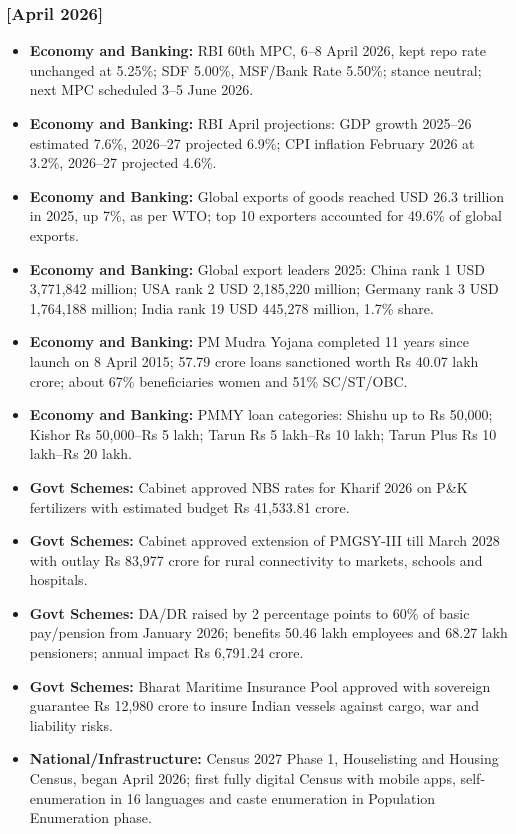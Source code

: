 \documentclass[10pt,a4paper]{article}
\newcommand{\monthtag}[1]{\textbf{[#1]}}
\begin{document}
\subsubsection{\monthtag{April 2026}}
\begin{itemize}
    \item \textbf{Economy and Banking:} RBI 60th MPC, 6--8 April 2026, kept repo rate unchanged at 5.25\%; SDF 5.00\%, MSF/Bank Rate 5.50\%; stance neutral; next MPC scheduled 3--5 June 2026.
    \item \textbf{Economy and Banking:} RBI April projections: GDP growth 2025--26 estimated 7.6\%, 2026--27 projected 6.9\%; CPI inflation February 2026 at 3.2\%, 2026--27 projected 4.6\%.
    \item \textbf{Economy and Banking:} Global exports of goods reached USD 26.3 trillion in 2025, up 7\%, as per WTO; top 10 exporters accounted for 49.6\% of global exports.
    \item \textbf{Economy and Banking:} Global export leaders 2025: China rank 1 USD 3,771,842 million; USA rank 2 USD 2,185,220 million; Germany rank 3 USD 1,764,188 million; India rank 19 USD 445,278 million, 1.7\% share.
    \item \textbf{Economy and Banking:} PM Mudra Yojana completed 11 years since launch on 8 April 2015; 57.79 crore loans sanctioned worth Rs 40.07 lakh crore; about 67\% beneficiaries women and 51\% SC/ST/OBC.
    \item \textbf{Economy and Banking:} PMMY loan categories: Shishu up to Rs 50,000; Kishor Rs 50,000--Rs 5 lakh; Tarun Rs 5 lakh--Rs 10 lakh; Tarun Plus Rs 10 lakh--Rs 20 lakh.
    \item \textbf{Govt Schemes:} Cabinet approved NBS rates for Kharif 2026 on P\&K fertilizers with estimated budget Rs 41,533.81 crore.
    \item \textbf{Govt Schemes:} Cabinet approved extension of PMGSY-III till March 2028 with outlay Rs 83,977 crore for rural connectivity to markets, schools and hospitals.
    \item \textbf{Govt Schemes:} DA/DR raised by 2 percentage points to 60\% of basic pay/pension from January 2026; benefits 50.46 lakh employees and 68.27 lakh pensioners; annual impact Rs 6,791.24 crore.
    \item \textbf{Govt Schemes:} Bharat Maritime Insurance Pool approved with sovereign guarantee Rs 12,980 crore to insure Indian vessels against cargo, war and liability risks.
    \item \textbf{National/Infrastructure:} Census 2027 Phase 1, Houselisting and Housing Census, began April 2026; first fully digital Census with mobile apps, self-enumeration in 16 languages and caste enumeration in Population Enumeration phase.

\end{itemize}
\end{document}
